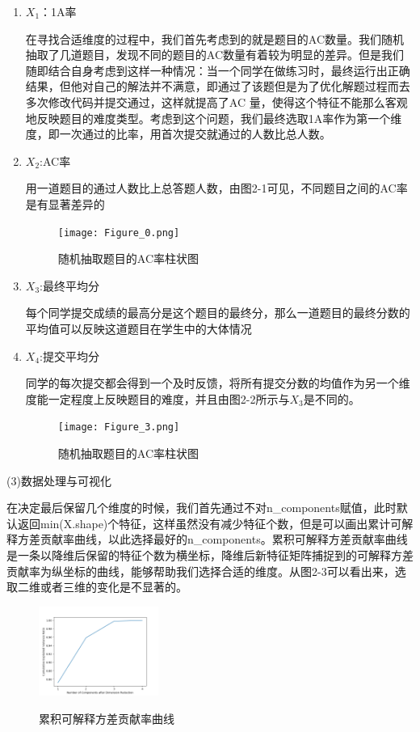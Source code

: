 \documentclass[UTF8]{ctexart}
\begin{document}
	\begin{enumerate}
		\item $X_1$：1A率
		\par 在寻找合适维度的过程中，我们首先考虑到的就是题目的AC数量。我们随机抽取了几道题目，发现不同的题目的AC数量有着较为明显的差异。但是我们随即结合自身考虑到这样一种情况：当一个同学在做练习时，最终运行出正确结果，但他对自己的解法并不满意，即通过了该题但是为了优化解题过程而去多次修改代码并提交通过，这样就提高了AC 量，使得这个特征不能那么客观地反映题目的难度类型。考虑到这个问题，我们最终选取1A率作为第一个维度，即一次通过的比率，用首次提交就通过的人数比总人数。
		\item $X_2$:AC率
		\par 用一道题目的通过人数比上总答题人数，由图2-1可见，不同题目之间的AC率是有显著差异的
		\begin{figure}[!htbp]
			\centering
			\texttt{[image: Figure\_0.png]}\\
			\caption{随机抽取题目的AC率柱状图}
		\end{figure}
		\item $X_3$:最终平均分
		\par 每个同学提交成绩的最高分是这个题目的最终分，那么一道题目的最终分数的平均值可以反映这道题目在学生中的大体情况
		\item $X_4$:提交平均分
		\par 同学的每次提交都会得到一个及时反馈，将所有提交分数的均值作为另一个维度能一定程度上反映题目的难度，并且由图2-2所示与$X_3$是不同的。
		\begin{figure}[!htbp]
			\centering
			\texttt{[image: Figure\_3.png]}\\
			\caption{随机抽取题目的AC率柱状图}
		\end{figure}
	\end{enumerate}
	\par (3)数据处理与可视化
	\par 在决定最后保留几个维度的时候，我们首先通过不对n\_components赋值，此时默认返回min(X.shape)个特征，这样虽然没有减少特征个数，但是可以画出累计可解释方差贡献率曲线，以此选择最好的n\_components。累积可解释方差贡献率曲线是一条以降维后保留的特征个数为横坐标，降维后新特征矩阵捕捉到的可解释方差贡献率为纵坐标的曲线，能够帮助我们选择合适的维度。从图2-3可以看出来，选取二维或者三维的变化是不显著的。
	\begin{figure}[!htbp]
		\centering
		\includegraphics[width=0.35\textwidth]{Figure_2.png}\\
		\caption{累积可解释方差贡献率曲线}
	\end{figure}
\end{document}
